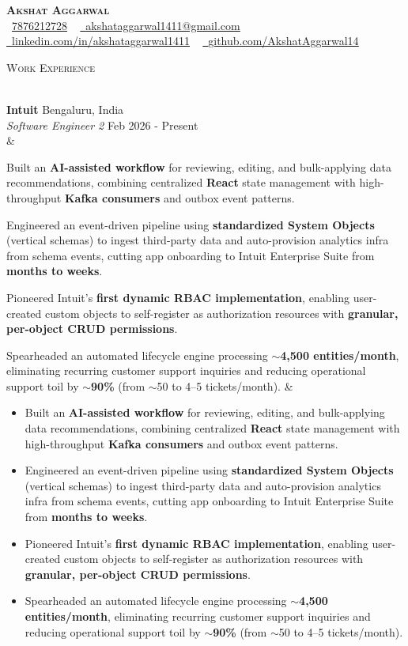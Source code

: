 \documentclass[a4paper]{article}
\newcommand{\tiniestBulletSep} { \vspace{0.5mm} }
\newcommand{\lineunder} {
    \vspace*{-8pt} \\
    \hspace*{-15pt} \hrulefill \\
}
\newcommand{\header} [1] {
    {\hspace*{-18pt}\vspace*{6pt} {
        \fontfamily{qcs}\selectfont \large \scshape #1
    }}
    \vspace*{-6pt} \lineunder
    \vspace{1.1mm}
}
\newcommand{\experienceCompany}[2]{
    \textbf{#1} \hfill #2 \\
}
\newcommand{\experienceRole}[3]{
    \textit{#1} \hfill #2 \\
    \ifx&#3&%
    \else
    \begin{itemize}
        #3
    \end{itemize}
    \fi
    \vspace{0.75mm}
}
\newcommand{\link}[2]{
    \href{#1}{\textbf{#2}}
}
\begin{document}

\begin{center}
    {\textbf{\Huge \scshape Akshat Aggarwal}} \\ \vspace{4pt}
    \small \textcolor{black}{\raisebox{-0.1\height}\faPhone\
        \href{tel:+917876212728}{7876212728}} ~ \href{mailto:akshataggarwal1411@gmail.com}{{\raisebox{-0.2\height}\faEnvelope\  \underline{akshataggarwal1411@gmail.com}}} ~
    \href{https://www.linkedin.com/in/akshataggarwal1411/}{{\raisebox{-0.2\height}\faLinkedinSquare\ \underline{linkedin.com/in/akshataggarwal1411}}}  ~
    \href{https://github.com/AkshatAggarwal14}{{\raisebox{-0.2\height}\faGithub\ \underline{github.com/AkshatAggarwal14}}}
\end{center}

\vspace{0.5mm}

\hypersetup {
    urlcolor     = blue, %
}


\header{Work Experience}

\experienceCompany{Intuit}{Bengaluru, India}
\experienceRole{Software Engineer 2}{Feb 2026 - Present}{
    \item Built an \textbf{AI-assisted workflow} for reviewing, editing, and bulk-applying data recommendations, combining centralized \textbf{React} state management with high-throughput \textbf{Kafka consumers} and outbox event patterns.
    \item Engineered an event-driven pipeline using \textbf{standardized System Objects} (vertical schemas) to ingest third-party data and auto-provision analytics infra from schema events, cutting app onboarding to Intuit Enterprise Suite from \textbf{months to weeks}.
    \item Pioneered Intuit's \textbf{first dynamic RBAC implementation}, enabling user-created custom objects to self-register as authorization resources with \textbf{granular, per-object CRUD permissions}.
    \item Spearheaded an automated lifecycle engine processing \textbf{$\sim$4,500 entities/month}, eliminating recurring customer support inquiries and reducing operational support toil by \textbf{$\sim$90\%} (from $\sim$50 to 4--5 tickets/month).
}
\tiniestBulletSep
\end{document}
